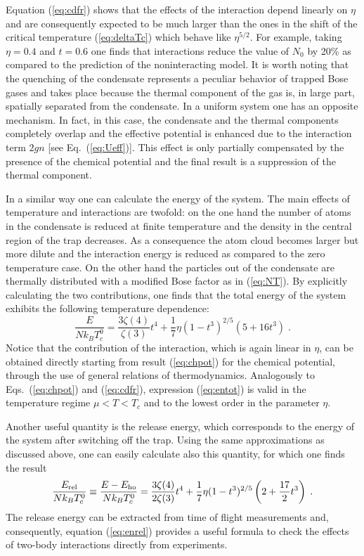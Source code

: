 Equation (\ref{eq:cdfr}) shows that the effects of the interaction
 depend linearly  on $\eta$
and are consequently expected to be much larger  than the ones in the
shift of the critical temperature  (\ref{eq:deltaTc}) which behave
like $\eta^{5/2}$.  For example, taking $\eta=0.4$ and $t=0.6$ one finds
that interactions reduce the value of $N_0$ by 20\% as compared to the
prediction of the noninteracting model.  It is worth noting that  the
quenching of the condensate  represents a peculiar behavior of
trapped Bose gases and takes place because the thermal component of the 
gas is, in large part, spatially
separated from the condensate. In a uniform  system one has an opposite
mechanism. In fact, in this case, the condensate  and the thermal components
completely overlap and the effective  potential is enhanced due to the
interaction  term $2gn$ [see Eq.~(\ref{eq:Ueff})].
This effect is only partially compensated by the presence of the
chemical potential and the final result is a suppression of the
thermal component.

In a similar way one can calculate the energy of the system. The main
effects of temperature and interactions are twofold: on the one hand the 
number of atoms in the condensate is reduced at finite temperature and
the density in the central region of the trap decreases. As a consequence
the atom cloud becomes larger but more dilute and the interaction energy
is reduced as compared to the zero temperature case. On the other hand 
the particles out of the condensate are
thermally distributed with a modified Bose factor  as in (\ref{eq:NT}).
By explicitly calculating the two contributions, one finds that the total
energy of the system  exhibits  the following temperature dependence:
\begin{equation}
\frac{E}{Nk_BT_c^0} = \frac{3\zeta(4)}{\zeta(3)} t^4 +
\frac{1}{7} \eta (1-t^3)^{2/5}
(5 + 16 t^3) \;.
\label{eq:entot}
\end{equation}
Notice that the contribution of the interaction, which is again linear
in $\eta$,  can be obtained directly starting from result (\ref{eq:chpot})
for the chemical potential, through the use of general relations of
thermodynamics. Analogously to Eqs.~(\ref{eq:chpot}) and (\ref{eq:cdfr}),
expression (\ref{eq:entot}) is valid in the temperature regime $\mu<T<T_c$
and to the lowest order in the parameter $\eta$.  

Another useful quantity  is the release energy, which
corresponds to the energy of the system after switching off the trap.
Using the same approximations as discussed above,  one can easily calculate
also this quantity, for which one finds the result
\begin{equation}
\frac{E_{\rm rel}}{Nk_BT_c^0} \equiv \frac{E-E_{\rm ho}}{Nk_BT_c^0}
= \frac{3\zeta(4)}{2\zeta(3)} t^4 + \frac{1}{7} \eta (1-t^3)^{2/5}
\left( 2+\frac{17}{2}t^3 \right) \;.
\label{eq:enrel}
\end{equation}
The release energy can be extracted from time of flight measurements and, 
consequently, equation (\ref{eq:enrel}) provides a useful
formula to check the  effects of two-body interactions
directly from experiments.

